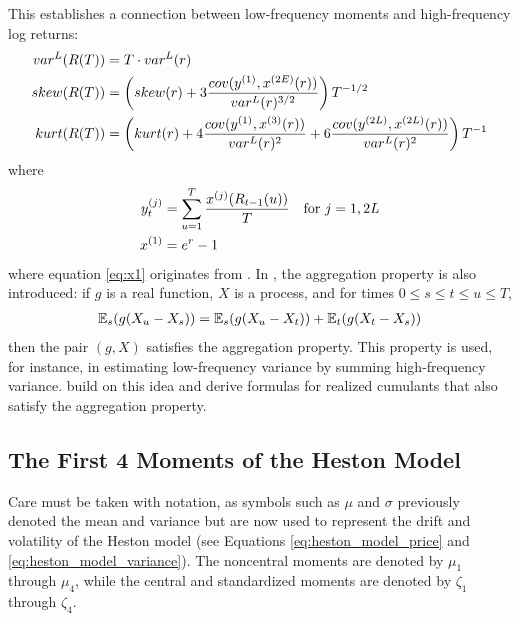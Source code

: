 This establishes a connection between low-frequency moments and high-frequency log returns:
\begin{align}
    var^L(R(T)) &= T\cdot var^L(r) \notag \\
    skew(R(T)) &= \left(skew(r) + 3\frac{cov(y^{(1)}, x^{(2E)}(r))}{var^L(r)^{3/2}}\right)T^{-1/2} \notag \\
    kurt(R(T)) &= \left(kurt(r) + 4\frac{cov(y^{(1)}, x^{(3)}(r))}{var^L(r)^2} + 6\frac{cov(y^{(2L)}, x^{(2L)}(r))}{var^L(r)^2}\right)T^{-1} \notag
\end{align}
where
\begin{align}
    y_t^{(j)} &= \sum_{u=1}^T \frac{x^{(j)}(R_{t-1}(u))}{T} \quad\text{for } j = 1,2L\notag \\
    \label{eq:x1}
    x^{(1)} &= e^r-1
\end{align}
where equation \eqref{eq:x1} originates from \cite{neubergerRealizedSkewness2012}. In \cite{neubergerRealizedSkewness2012}, the aggregation property is also introduced: if $g$ is a real function, $X$ is a process, and for times $0\le s\le t\le u\le T$,
\begin{align}
    \mathbb{E}_s(g(X_u-X_s)) = \mathbb{E}_s(g(X_u-X_t)) + \mathbb{E}_t(g(X_t-X_s))\notag
\end{align}
then the pair $(g,X)$ satisfies the aggregation property. This property is used, for instance, in estimating low-frequency variance by summing high-frequency variance. \cite{fukasawaRealizedCumulantsMartingales2021} build on this idea and derive formulas for realized cumulants that also satisfy the aggregation property.

\subsection{The First 4 Moments of the Heston Model}

Care must be taken with notation, as symbols such as $\mu$ and $\sigma$ previously denoted the mean and variance but are now used to represent the drift and volatility of the Heston model (see Equations \eqref{eq:heston_model_price} and \eqref{eq:heston_model_variance}). The noncentral moments are denoted by $\mu_1$ through $\mu_4$, while the central and standardized moments are denoted by $\zeta_1$ through $\zeta_4$.

